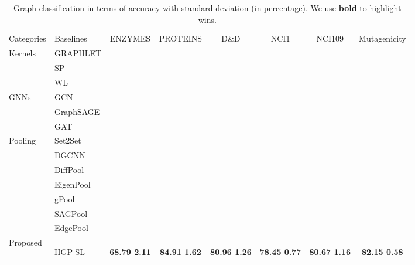 \documentclass[letterpaper]{article} \usepackage{aaai20}  \usepackage{times}  \usepackage{helvet} \usepackage{courier}  \usepackage[hyphens]{url}  \usepackage{graphicx} \urlstyle{rm} \def\UrlFont{\rm}  \usepackage{graphicx}  \frenchspacing  \setlength{\pdfpagewidth}{8.5in}  \setlength{\pdfpageheight}{11in}
\begin{document}
\begin{table*}
    \centering
    \small
    \begin{tabular}{ llcccccc }
    \toprule[0.8pt]
    Categories 				& Baselines & ENZYMES 	& PROTEINS	& D\&D 		& NCI1 		& NCI109 	& Mutagenicity		\\
    \cmidrule[0.5pt]{1-8}
    \multirow{3}{*}{Kernels}& GRAPHLET  &  &  &  &  &  						& \\
    						& SP		&  &  &  &  &  & \\
    						& WL		&  &  &  &  &  & \\
    \cmidrule[0.5pt]{1-8}
    \multirow{3}{*}{GNNs}	& GCN     	&  &  &  &  &  						& \\
    						& GraphSAGE	&  &  &  &  &  & \\
   							& GAT		&  &  &  &  &  & \\
   	\cmidrule[0.5pt]{1-8}
   	\multirow{7}{*}{Pooling}& Set2Set	&  &  &  &  &  						& \\
   							& DGCNN		&  &  &  & 	&  &  \\
   							& DiffPool	&  &  &  &  &  &  \\
   							& EigenPool &  &  &  &  &  &  	\\
   							& gPool		&  &  &  &  &  & 	\\
   							& SAGPool	&  &  &  &  &  & 	\\
    						& EdgePool	&  &  &  &  &  & 	\\
    \cmidrule[0.5pt]{1-8}
    \multirow{4}{*}{Proposed} 	& 	& 	& 	&   	& 		& 								& 			\\
    							& 	& 	& 	&   	& 			& 	& 			\\
    							& 	& 	& 	&   	& 			& 	& 			\\
    							& HGP-SL	& \textbf{68.79  2.11} & \textbf{84.91  1.62} & \textbf{80.96  1.26} & \textbf{78.45  0.77}	& \textbf{80.67  1.16} & \textbf{82.15  0.58}	\\
    \bottomrule[0.8pt]
    \end{tabular}
    \caption{Graph classification in terms of accuracy with standard deviation (in percentage). We use \textbf{bold} to highlight wins.}
    \label{tab:classification_result}
\end{table*}
\end{document}
